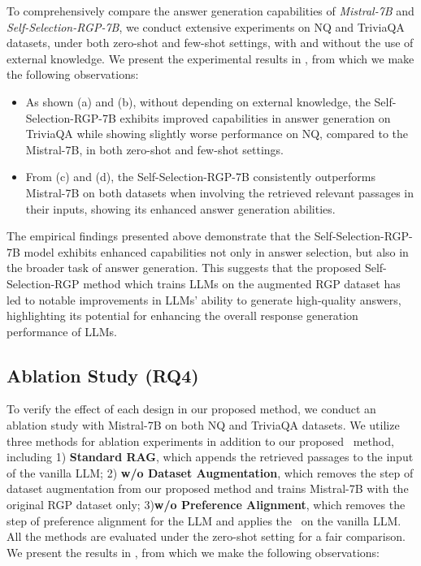 To comprehensively compare the answer generation capabilities of \emph{Mistral-7B} and \emph{Self-Selection-RGP-7B}, we conduct extensive experiments on NQ and TriviaQA datasets, under both zero-shot and few-shot settings, with and without the use of external knowledge.
We present the experimental results in , from which we make the following observations:
\begin{itemize} [leftmargin=*,nosep]
    \item As shown  (a) and (b), without depending on external knowledge, the Self-Selection-RGP-7B exhibits improved capabilities in answer generation on TriviaQA while showing slightly worse performance on NQ, compared to the Mistral-7B, in both zero-shot and few-shot settings.  
    \item From  (c) and (d), the Self-Selection-RGP-7B consistently outperforms Mistral-7B on both datasets when involving the retrieved relevant passages in their inputs, showing its enhanced answer generation abilities.
\end{itemize}
 
 The empirical findings presented above demonstrate that the Self-Selection-RGP-7B model exhibits enhanced capabilities not only in answer selection, but also in the broader task of answer generation.
 This suggests that the proposed Self-Selection-RGP method which trains LLMs on the augmented RGP dataset has led to notable improvements in LLMs' ability to generate high-quality answers, highlighting its potential for enhancing the overall response generation performance of LLMs.


\subsection{Ablation Study (RQ4)}

To verify the effect of each design in our proposed method, we conduct an ablation study with Mistral-7B on both NQ and TriviaQA datasets.
We utilize three methods for ablation experiments in addition to our proposed \approach~method, including 
1) \textbf{Standard RAG}, which appends the retrieved passages to the input of the vanilla LLM;
2) \textbf{w/o Dataset Augmentation}, which removes the step of dataset augmentation from our proposed method and trains Mistral-7B with the original RGP dataset only; 
3)\textbf{w/o Preference Alignment}, which removes the step of preference alignment for the LLM and applies the \framework~on the vanilla LLM.
All the methods are evaluated under the zero-shot setting for a fair comparison.
We present the results in , from which we make the following observations: 

